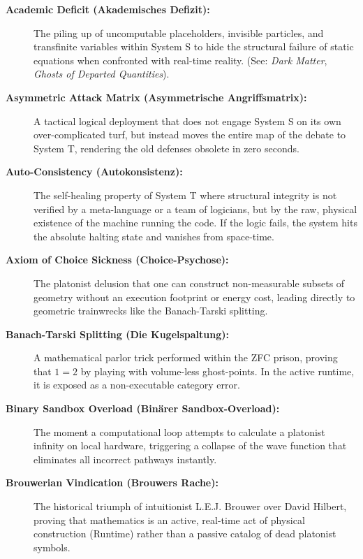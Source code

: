 \documentclass[11pt,a4paper]{article}
\begin{document}
\begin{description}
    \item[\textbf{Academic Deficit (Akademisches Defizit):}] The piling up of uncomputable placeholders, invisible particles, and transfinite variables within System S to hide the structural failure of static equations when confronted with real-time reality. (See: \textit{Dark Matter}, \textit{Ghosts of Departed Quantities}).
    
    \item[\textbf{Asymmetric Attack Matrix (Asymmetrische Angriffsmatrix):}] A tactical logical deployment that does not engage System S on its own over-complicated turf, but instead moves the entire map of the debate to System T, rendering the old defenses obsolete in zero seconds.
    
    \item[\textbf{Auto-Consistency (Autokonsistenz):}] The self-healing property of System T where structural integrity is not verified by a meta-language or a team of logicians, but by the raw, physical existence of the machine running the code. If the logic fails, the system hits the absolute halting state and vanishes from space-time.
    
    \item[\textbf{Axiom of Choice Sickness (Choice-Psychose):}] The platonist delusion that one can construct non-measurable subsets of geometry without an execution footprint or energy cost, leading directly to geometric trainwrecks like the Banach-Tarski splitting.
    
    \item[\textbf{Banach-Tarski Splitting (Die Kugelspaltung):}] A mathematical parlor trick performed within the ZFC prison, proving that $1=2$ by playing with volume-less ghost-points. In the active runtime, it is exposed as a non-executable category error.
    
    \item[\textbf{Binary Sandbox Overload (Binärer Sandbox-Overload):}] The moment a computational loop attempts to calculate a platonist infinity on local hardware, triggering a collapse of the wave function that eliminates all incorrect pathways instantly.
    
    \item[\textbf{Brouwerian Vindication (Brouwers Rache):}] The historical triumph of intuitionist L.E.J. Brouwer over David Hilbert, proving that mathematics is an active, real-time act of physical construction (Runtime) rather than a passive catalog of dead platonist symbols.
    

\end{description}
\end{document}
